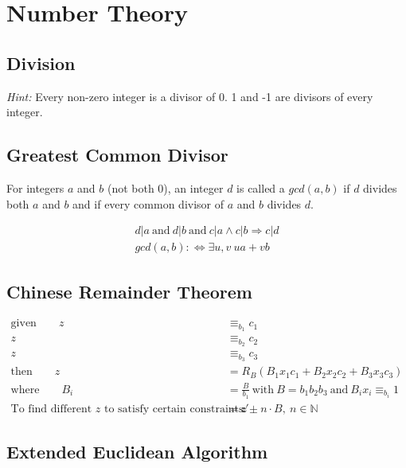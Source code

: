\documentclass[11pt]{article}
\begin{document}
\section{Number Theory}

\subsection{Division}

\emph{Hint:} Every non-zero integer is a divisor of 0. 1 and -1 are divisors of every integer.

\subsection{Greatest Common Divisor}

For integers $a$ and $b$ (not both 0), an integer $d$ is called a $gcd(a,b)$ if $d$ divides both $a$ and $b$ and if every common divisor of $a$ and $b$ divides $d$.

\begin{equation*}
\begin{split}
	d|a\ \text{and}\ d|b\ \text{and}\ c|a \land c|b \Rightarrow c|d \\
	gcd(a,b) :\Leftrightarrow \exists u,v\ ua + vb
\end{split}
\end{equation*}

\subsection{Chinese Remainder Theorem}

\begin{equation*}
\begin{split}
	\text{given}\qquad z & \equiv_{b_1} c_1 \\
	z & \equiv_{b_2} c_2 \\
	z & \equiv_{b_3} c_3 \\
	\text{then}\qquad z & = R_B(B_1x_1c_1 + B_2x_2c_2 + B_3x_3c_3) \\
	\text{where}\qquad B_i & = \frac{B}{b_1}\ \text{with}\ B = b_1b_2b_3\ \text{and}\ B_ix_i \equiv_{b_i} 1 \\
	\text{To find different $z$ to satisfy certain constraints}\qquad z' & = z \pm n \cdot B,\ n \in \mathbb{N}
\end{split}
\end{equation*}

\subsection{Extended Euclidean Algorithm}
\end{document}
